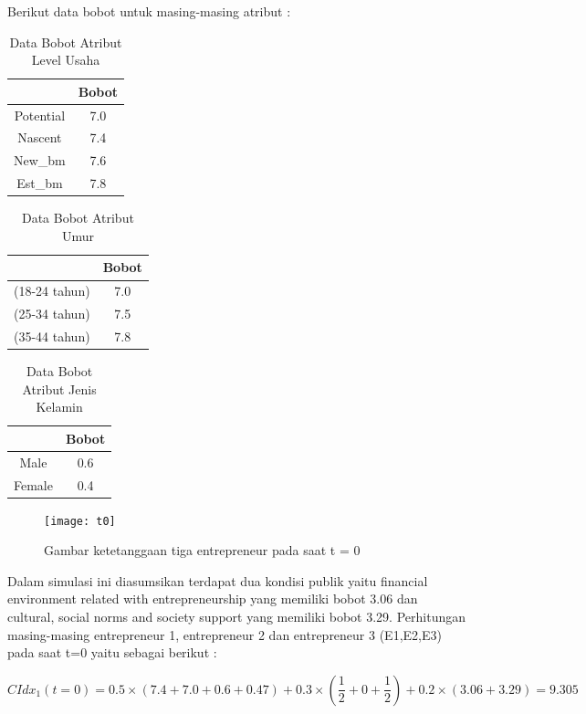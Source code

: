 \documentclass[a4paper,twoside]{article}
\begin{document}
\begin{enumerate}
Berikut data bobot untuk masing-masing atribut :

\begin{table} [H]
\centering
\caption{Data Bobot Atribut Level Usaha}
\begin{tabular}{|c|c|}
\hline
& Bobot\\
\hline
Potential & 7.0\\
\hline
Nascent & 7.4\\
\hline
New\_bm & 7.6\\
\hline
Est\_bm & 7.8\\
\hline
\end{tabular}
\end{table}

\begin{table} [H]
\centering
\caption{Data Bobot Atribut Umur}
\begin{tabular}{|c|c|}
\hline
& Bobot\\
\hline
(18-24 tahun) & 7.0\\
\hline
(25-34 tahun) & 7.5\\
\hline
(35-44 tahun) & 7.8\\
\hline
\end{tabular}
\end{table}


\begin{table} [H]
\centering
\caption{Data Bobot Atribut Jenis Kelamin}
\begin{tabular}{|c|c|}
\hline
& Bobot\\
\hline
Male & 0.6\\
\hline
Female & 0.4\\
\hline
\end{tabular}
\end{table}
				

	\begin{figure} [H]
		\centering  
		\texttt{[image: t0]} 
		\caption[Gambar ketetanggaan tiga entrepreneur pada saat t = 0]{Gambar ketetanggaan tiga entrepreneur pada saat t = 0} 
		\label{fig:t0} 
	\end{figure}


Dalam simulasi ini diasumsikan terdapat dua kondisi publik yaitu financial environment related with entrepreneurship yang memiliki bobot 3.06 dan cultural, social norms and society support yang memiliki bobot 3.29. Perhitungan masing-masing entrepreneur 1, entrepreneur 2 dan entrepreneur 3 (E1,E2,E3) pada saat t=0 yaitu sebagai berikut :
	

\begin{equation}
	CIdx_{1}(t=0) = 0.5 \times (7.4 + 7.0 + 0.6 + 0.47) + 0.3 \times (\frac {1} {2} + 0 +  \frac {1} {2}) + 0.2 \times (3.06 + 3.29) = 9.305
\end{equation}	


\end{enumerate}
\end{document}
